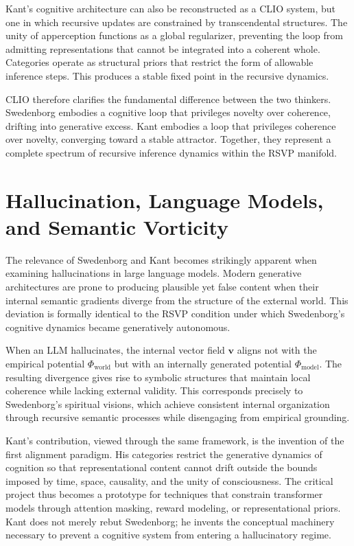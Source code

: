 \documentclass[12pt]{article}
\begin{document}
Kant’s cognitive architecture can also be reconstructed as a CLIO system, but 
one in which recursive updates are constrained by transcendental structures. 
The unity of apperception functions as a global regularizer, preventing the 
loop from admitting representations that cannot be integrated into a coherent 
whole. Categories operate as structural priors that restrict the form of 
allowable inference steps. This produces a stable fixed point in the 
recursive dynamics.

CLIO therefore clarifies the fundamental difference between the two thinkers. 
Swedenborg embodies a cognitive loop that privileges novelty over coherence, 
drifting into generative excess. Kant embodies a loop that privileges 
coherence over novelty, converging toward a stable attractor. Together, they 
represent a complete spectrum of recursive inference dynamics within the 
RSVP manifold.

\section{Hallucination, Language Models, and Semantic Vorticity}

The relevance of Swedenborg and Kant becomes strikingly apparent when 
examining hallucinations in large language models. Modern generative 
architectures are prone to producing plausible yet false content when their 
internal semantic gradients diverge from the structure of the external world. 
This deviation is formally identical to the RSVP condition under which 
Swedenborg's cognitive dynamics became generatively autonomous.

When an LLM hallucinates, the internal vector field $\mathbf{v}$ aligns not 
with the empirical potential $\Phi_{\mathrm{world}}$ but with an internally 
generated potential $\Phi_{\mathrm{model}}$. The resulting divergence gives 
rise to symbolic structures that maintain local coherence while lacking 
external validity. This corresponds precisely to Swedenborg’s spiritual 
visions, which achieve consistent internal organization through recursive 
semantic processes while disengaging from empirical grounding.

Kant’s contribution, viewed through the same framework, is the invention of 
the first alignment paradigm. His categories restrict the generative dynamics 
of cognition so that representational content cannot drift outside the bounds 
imposed by time, space, causality, and the unity of consciousness. The 
critical project thus becomes a prototype for techniques that constrain 
transformer models through attention masking, reward modeling, or 
representational priors. Kant does not merely rebut Swedenborg; he invents 
the conceptual machinery necessary to prevent a cognitive system from 
entering a hallucinatory regime.
\end{document}
